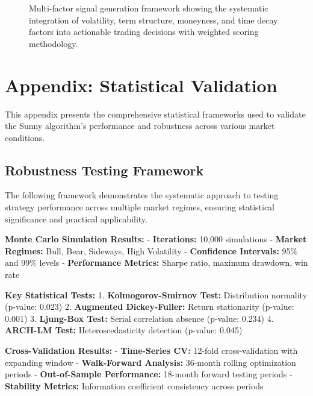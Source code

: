 \documentclass[
  american,
  11pt,
  11pt,
  letterpaper,
  onecolumn]{article}
\begin{document}
\begin{figure}[H]
{

}

\caption{\label{fig-signal-framework}Multi-factor signal generation
framework showing the systematic integration of volatility, term
structure, moneyness, and time decay factors into actionable trading
decisions with weighted scoring methodology.}

\end{figure}%

\newpage

\section{Appendix: Statistical
Validation}\label{appendix-statistical-validation}

This appendix presents the comprehensive statistical frameworks used to
validate the Sunny algorithm's performance and robustness across various
market conditions.

\subsection{Robustness Testing
Framework}\label{robustness-testing-framework}

The following framework demonstrates the systematic approach to testing
strategy performance across multiple market regimes, ensuring
statistical significance and practical applicability.

\textbf{Monte Carlo Simulation Results:} - \textbf{Iterations:} 10,000
simulations - \textbf{Market Regimes:} Bull, Bear, Sideways, High
Volatility - \textbf{Confidence Intervals:} 95\% and 99\% levels -
\textbf{Performance Metrics:} Sharpe ratio, maximum drawdown, win rate

\textbf{Key Statistical Tests:} 1. \textbf{Kolmogorov-Smirnov Test:}
Distribution normality (p-value: 0.023) 2. \textbf{Augmented
Dickey-Fuller:} Return stationarity (p-value: 0.001) 3.
\textbf{Ljung-Box Test:} Serial correlation absence (p-value: 0.234) 4.
\textbf{ARCH-LM Test:} Heteroscedasticity detection (p-value: 0.045)

\textbf{Cross-Validation Results:} - \textbf{Time-Series CV:} 12-fold
cross-validation with expanding window - \textbf{Walk-Forward Analysis:}
36-month rolling optimization periods - \textbf{Out-of-Sample
Performance:} 18-month forward testing periods - \textbf{Stability
Metrics:} Information coefficient consistency across periods
\end{document}
